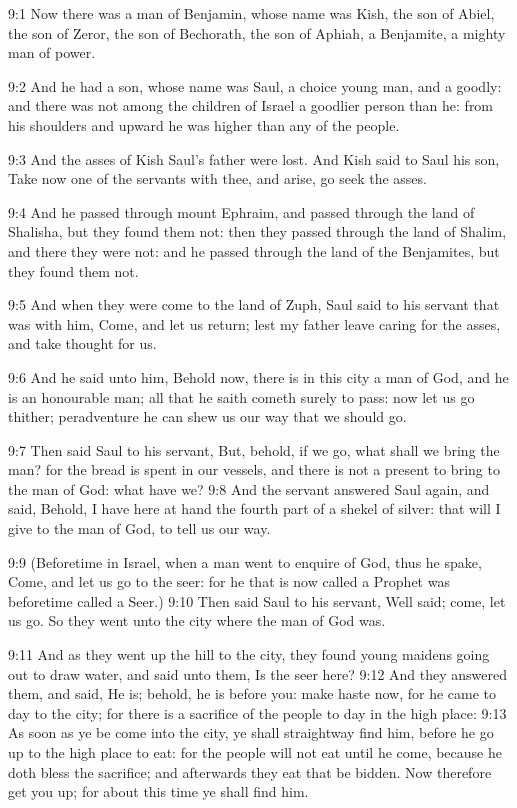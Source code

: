 9:1 Now there was a man of Benjamin, whose name was Kish, the son of
Abiel, the son of Zeror, the son of Bechorath, the son of Aphiah, a
Benjamite, a mighty man of power.

9:2 And he had a son, whose name was Saul, a choice young man, and a
goodly: and there was not among the children of Israel a goodlier
person than he: from his shoulders and upward he was higher than any
of the people.

9:3 And the asses of Kish Saul's father were lost. And Kish said to
Saul his son, Take now one of the servants with thee, and arise, go
seek the asses.

9:4 And he passed through mount Ephraim, and passed through the land
of Shalisha, but they found them not: then they passed through the
land of Shalim, and there they were not: and he passed through the
land of the Benjamites, but they found them not.

9:5 And when they were come to the land of Zuph, Saul said to his
servant that was with him, Come, and let us return; lest my father
leave caring for the asses, and take thought for us.

9:6 And he said unto him, Behold now, there is in this city a man of
God, and he is an honourable man; all that he saith cometh surely to
pass: now let us go thither; peradventure he can shew us our way that
we should go.

9:7 Then said Saul to his servant, But, behold, if we go, what shall
we bring the man? for the bread is spent in our vessels, and there is
not a present to bring to the man of God: what have we?  9:8 And the
servant answered Saul again, and said, Behold, I have here at hand the
fourth part of a shekel of silver: that will I give to the man of God,
to tell us our way.

9:9 (Beforetime in Israel, when a man went to enquire of God, thus he
spake, Come, and let us go to the seer: for he that is now called a
Prophet was beforetime called a Seer.)  9:10 Then said Saul to his
servant, Well said; come, let us go. So they went unto the city where
the man of God was.

9:11 And as they went up the hill to the city, they found young
maidens going out to draw water, and said unto them, Is the seer here?
9:12 And they answered them, and said, He is; behold, he is before
you: make haste now, for he came to day to the city; for there is a
sacrifice of the people to day in the high place: 9:13 As soon as ye
be come into the city, ye shall straightway find him, before he go up
to the high place to eat: for the people will not eat until he come,
because he doth bless the sacrifice; and afterwards they eat that be
bidden. Now therefore get you up; for about this time ye shall find
him.

